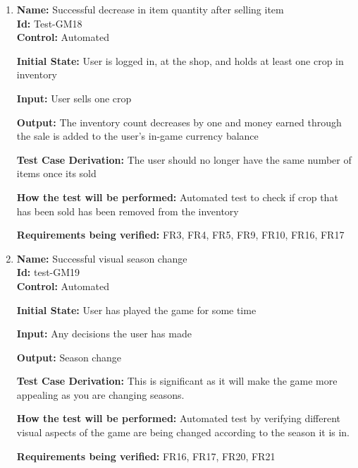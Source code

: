 \documentclass[12pt, titlepage]{article}
\begin{document}
\begin{enumerate}
\item{\textbf{Name:} Successful decrease in item quantity after selling item\\} %
\textbf{Id:} Test-GM18 \label{Test-GM18}\\

\textbf{Control:} Automated

\textbf{Initial State:} User is logged in, at the shop, and holds at least one crop in inventory

\textbf{Input:} User sells one crop

\textbf{Output:} The inventory count decreases by one and money earned through the sale is added to the user's in-game currency balance

\textbf{Test Case Derivation:} The user should no longer have the same number of items once its sold

\textbf{How the test will be performed: }Automated test to check if crop that has been sold has been removed from the inventory

\textbf{Requirements being verified:} FR3, FR4, FR5, FR9, FR10, FR16, FR17


\item{\textbf{Name: }Successful visual season change\\} %
\textbf{Id:} test-GM19 \label{Test-GM19}\\

\textbf{Control:} Automated

\textbf{Initial State:} User has played the game for some time

\textbf{Input:} Any decisions the user has made

\textbf{Output:} Season change

\textbf{Test Case Derivation: }This is significant as it will make the game more appealing as you are changing seasons.

\textbf{How the test will be performed:} Automated test by verifying different visual aspects of the game are being changed according to the season it is in.

\textbf{Requirements being verified:} FR16, FR17, FR20, FR21
\end{enumerate}
\end{document}

